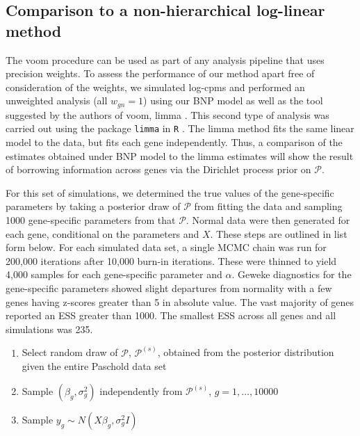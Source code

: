 \subsection{Comparison to a non-hierarchical log-linear method}
\label{sec:ss1}
The voom procedure can be used as part of any analysis pipeline that uses precision weights. To assess the performance of our method apart free of consideration of the weights, we simulated log-cpms and performed an unweighted analysis (all $w_{gn}=1$) using our BNP model as well as the tool suggested by the authors of voom, limma \citep{smyth2005limma}. This second type of analysis was carried out using the package \texttt{limma} in \texttt{R} \citep{smyth2005limma}. The limma method fits the same linear model to the data, but fits each gene independently. Thus, a comparison of the estimates obtained under BNP model to the limma estimates will show the result of borrowing information across genes via the Dirichlet process prior on $\mathcal{P}$.

For this set of simulations, we determined the true values of the gene-specific parameters by taking a posterior draw of $\mathcal{P}$ from fitting the \citet{paschold} data and sampling 1000 gene-specific parameters from that $\mathcal{P}$. Normal data were then generated for each gene, conditional on the parameters and $X$. These steps are outlined in list form below. For each simulated data set, a single MCMC chain was run for 200,000 iterations after 10,000 burn-in iterations. These were thinned to yield 4,000 samples for each gene-specific parameter and $\alpha$. Geweke diagnostics for the gene-specific parameters showed slight departures from normality with a few genes having z-scores greater than 5 in absolute value. The vast majority of genes reported an ESS greater than 1000. The smallest ESS across all genes and all simulations was 235.

\begin{enumerate}
\item Select random draw of $\mathcal{P}$, $\mathcal{P}^{(s)}$, obtained from the posterior distribution given the entire Paschold data set
\item Sample $(\beta_g,\sigma^2_g)$ independently from $\mathcal{P}^{(s)}$, $g=1,\ldots,10000$
\item Sample $y_{g} \sim N(X\beta_g,\sigma^2_g I)$
\end{enumerate}

